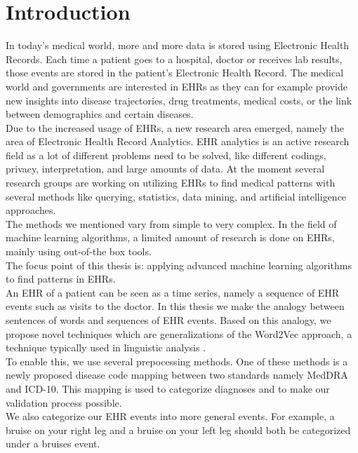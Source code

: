 \chapter{Introduction}
\label{cha:introduction}

In today's medical world, more and more data is stored using Electronic Health Records. Each time a patient goes to a hospital, doctor or receives lab results, those events are stored in the patient's Electronic Health Record. The medical world and governments are interested in EHRs as they can for example provide new insights into disease trajectories, drug treatments, medical costs, or the link between demographics and certain diseases. \\

Due to the increased usage of EHRs, a new research area emerged, namely the area of Electronic Health Record Analytics. EHR analytics is an active research field as a lot of different problems need to be solved, like different codings, privacy, interpretation, and large amounts of data. At the moment several research groups are working on utilizing EHRs to find medical patterns with several methods like querying, statistics, data mining, and artificial intelligence approaches. \\
The methods we mentioned vary from simple to very complex. In the field of machine learning algorithms, a limited amount of research is done on EHRs, mainly using out-of-the box tools. \\
The focus point of this thesis is: applying advanced machine learning algorithms to find patterns in EHRs. \\

An EHR of a patient can be seen as a time series, namely a sequence of EHR events such as visits to the doctor. In this thesis we make the analogy between sentences of words and sequences of EHR events. Based on this analogy, we propose novel techniques which are generalizations of the Word2Vec approach, a technique typically used in linguistic analysis \cite{w2vOriginal:article}. \\
To enable this, we use several prepocessing methods. One of these methods is a newly proposed disease code mapping between two standards namely MedDRA and ICD-10. This mapping is used to categorize diagnoses and to make our validation process possible.\\ 
We also categorize our EHR events into more general events. For example, a bruise on your right leg and a bruise on your left leg should both be categorized under a bruises event. \\


